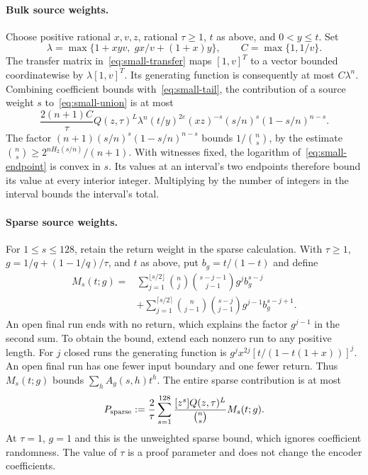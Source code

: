 \paragraph{Bulk source weights.}
Choose positive rational $x,v,z$, rational $\tau\ge1$, $t$ as above, and
$0<y\le t$. Set
\[
 \lambda=\max\{1+xyv,\;gx/v+(1+x)y\},\qquad C=\max\{1,1/v\}.
\]
The transfer matrix in~\eqref{eq:small-transfer} maps $[1,v]^T$ to a
vector bounded coordinatewise by $\lambda[1,v]^T$. Its generating
function is consequently at most $C\lambda^n$. Combining coefficient
bounds with~\eqref{eq:small-tail}, the contribution of a source weight
$s$ to~\eqref{eq:small-union} is at most
\begin{equation}\label{eq:small-endpoint}
 \frac{2(n+1)C}{\tau} Q(z,\tau)^L\lambda^n
 (t/y)^{2e}(xz)^{-s}(s/n)^s(1-s/n)^{n-s}.
\end{equation}
The factor $(n+1)(s/n)^s(1-s/n)^{n-s}$ bounds $1/\binom ns$, by the
estimate $\binom ns\ge2^{nH_2(s/n)}/(n+1)$. With witnesses fixed, the
logarithm of~\eqref{eq:small-endpoint} is convex in $s$. Its values at
an interval's two endpoints therefore bound its value at every interior
integer. Multiplying by the number of integers in the interval bounds
the interval's total.

\paragraph{Sparse source weights.}
For $1\le s\le128$, retain the return weight in the sparse
calculation. With $\tau\ge1$, $g=1/q+(1-1/q)/\tau$, and $t$ as above,
put $b_g=t/(1-t)$ and define
\begin{equation}\label{eq:small-sparse-moment}
\begin{aligned}
 M_s(t;g)={}&\sum_{j=1}^{\lfloor s/2\rfloor}
 \binom nj\binom{s-j-1}{j-1}g^j b_g^{s-j}\\
 &+\sum_{j=1}^{\lceil s/2\rceil}
 \binom n{j-1}\binom{s-j}{j-1}g^{j-1}b_g^{s-j+1}.
\end{aligned}
\end{equation}
An open final run ends with no return, which explains the factor
$g^{j-1}$ in the second sum. To obtain the bound, extend each nonzero
run to any positive length. For $j$ closed runs the generating function
is $g^j x^{2j}[t/(1-t(1+x))]^j$. An open final run has one fewer input
boundary and one fewer return. Thus $M_s(t;g)$ bounds
$\sum_h A_g(s,h)t^h$. The entire sparse contribution is at most
\begin{equation}\label{eq:small-sparse-weighted}
 P_{\rm sparse}:=\frac2\tau\sum_{s=1}^{128}
 \frac{[z^s]Q(z,\tau)^L}{\binom ns}M_s(t;g).
\end{equation}
At $\tau=1$, $g=1$ and this is the unweighted sparse bound, which
ignores coefficient randomness. The value of $\tau$ is a proof parameter
and does not change the encoder coefficients.

